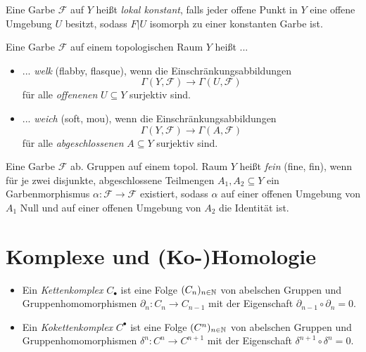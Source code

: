 \documentclass{cheat-sheet}
\newcommand{\CC}[1]{{#1}_{\bullet}} %
\newcommand{\CCC}[1]{{#1}^{\bullet}} %
\newcommand{\Fais}{\mathcal{F}} %
\begin{document}
\begin{samepage}

\begin{defn}
  Eine Garbe $\Fais$ auf $Y$ heißt \emph{lokal konstant}, falls jeder offene Punkt in $Y$ eine offene Umgebung $U$ besitzt, sodass $F|U$ isomorph zu einer konstanten Garbe ist.
\end{defn}

\begin{defn}
   Eine Garbe $\Fais$ auf einem topologischen Raum $Y$ heißt ...
  \begin{itemize}
    \item ... \emph{welk} (flabby, flasque), wenn die Einschränkungsabbildungen
    \[ \Gamma(Y, \Fais) \to \Gamma(U, \Fais) \]
    für alle {\em offenenen} $U \subseteq Y$ surjektiv sind.
    \item ... \emph{weich} (soft, mou), wenn die Einschränkungsabbildungen
    \[ \Gamma(Y, \Fais) \to \Gamma(A, \Fais) \]
    für alle {\em abgeschlossenen} $A \subseteq Y$ surjektiv sind.
  \end{itemize}
\end{defn}

\begin{defn}
   Eine Garbe $\Fais$ ab. Gruppen auf einem topol. Raum $Y$ heißt \emph{fein} (fine, fin), wenn für je zwei disjunkte, abgeschlossene Teilmengen $A_1, A_2 \subseteq Y$ ein Garbenmorphismus $\alpha : \Fais \to \Fais$ existiert, sodass $\alpha$ auf einer offenen Umgebung von $A_1$ Null und auf einer offenen Umgebung von $A_2$ die Identität ist.
\end{defn}

\section{Komplexe und (Ko-)Homologie}

\end{samepage}


\begin{defn}
  \begin{itemize}
    \item Ein \emph{Kettenkomplex} $\CC{C}$ ist eine Folge $(C_n)_{n \in \mathbb{N}}$ von abelschen Gruppen und Gruppenhomomorphismen $\partial_n : C_n \to C_{n-1}$ mit der Eigenschaft $\partial_{n-1} \circ \partial_n = 0$.
    \item Ein \emph{Kokettenkomplex} $\CCC{C}$ ist eine Folge $(C^n)_{n \in \mathbb{N}}$ von abelschen Gruppen und Gruppenhomomorphismen $\delta^n : C^n \to C^{n+1}$ mit der Eigenschaft $\delta^{n+1} \circ \delta^n = 0$.
  \end{itemize}
\end{defn}
\end{document}
